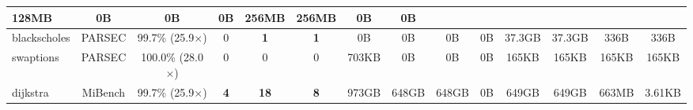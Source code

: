 {\begin{tabular}{|l|c|c||c|c||c||c|c|c|c||c|c|c|c|}
         128MB & 0B & 0B & 0B & 256MB & 256MB & 0B & 0B \\ %
\hline
blackscholes & PARSEC & 99.7\% (25.9$\times$) & 0 & \textbf{1} & \textbf{1} &
             0B & 0B & 0B & 0B & 37.3GB & 37.3GB & 336B & 336B \\ %
\hline
swaptions & PARSEC & 100.0\% (28.0$\times$)  & 0 & 0 & 0 &
          703KB & 0B & 0B & 0B & 165KB & 165KB & 165KB & 165KB \\ %
\hline
dijkstra & MiBench  & 99.7\% (25.9$\times$) & \textbf{4} & \textbf{18} & \textbf{8} &
         973GB & 648GB & 648GB & 0B & 649GB & 649GB & 663MB & 3.61KB \\ %
\hline
\end{tabular}
}
